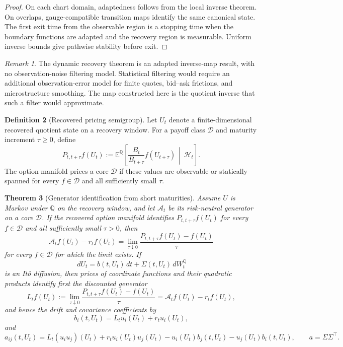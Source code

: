 \documentclass[11pt,a4paper]{amsart}
\theoremstyle{plain}
\newtheorem{theorem}{Theorem}[section]
\theoremstyle{definition}
\newtheorem{definition}[theorem]{Definition}
\theoremstyle{remark}
\newtheorem{remark}[theorem]{Remark}
\newcommand{\QQ}{\mathbb{Q}}
\newcommand{\EE}{\mathbb{E}}
\newcommand{\cD}{\mathcal{D}}
\newcommand{\cH}{\mathcal{H}}
\newcommand{\dd}{\,d}
\begin{document}
\begin{proof}
On each chart domain, adaptedness follows from the local inverse theorem.  On overlaps,
gauge-compatible transition maps identify the same canonical state.  The first exit time from
the observable region is a stopping time when the boundary functions are adapted and the
recovery region is measurable.  Uniform inverse bounds give pathwise stability before exit.
\end{proof}

\begin{remark}
The dynamic recovery theorem is an adapted inverse-map result, with no observation-noise filtering
model.  Statistical filtering would require an additional observation-error model for finite quotes,
bid--ask frictions, and microstructure smoothing.  The map constructed here is the
quotient inverse that such a filter would approximate.
\end{remark}

\begin{definition}[Recovered pricing semigroup]\label{def:recovered-pricing-semigroup}
Let \(U_t\) denote a finite-dimensional recovered quotient state on a recovery window.  For a
payoff class \(\cD\) and maturity increment \(\tau\ge0\), define
\[
        P_{t,t+\tau}f(U_t)
        :=
        \EE^\QQ\!\left[
        \frac{B_t}{B_{t+\tau}}f(U_{t+\tau})
        \,\middle|\,\cH_t
        \right].
\]
The option manifold prices a core \(\cD\) if these values are observable or statically spanned
for every \(f\in\cD\) and all sufficiently small \(\tau\).
\end{definition}

\begin{theorem}[Generator identification from short maturities]\label{thm:generator-identification}
Assume \(U\) is Markov under \(\QQ\) on the recovery window, and let \(\mathcal A_t\) be its
risk-neutral generator on a core \(\cD\).  If the recovered option manifold identifies
\(P_{t,t+\tau}f(U_t)\) for every \(f\in\cD\) and all sufficiently small \(\tau>0\), then
\[
        \mathcal A_t f(U_t)-r_tf(U_t)
        =
        \lim_{\tau\downarrow0}
        \frac{P_{t,t+\tau}f(U_t)-f(U_t)}{\tau}
\]
for every \(f\in\cD\) for which the limit exists.  If
\[
        \dd U_t=b(t,U_t)\dd t+\Sigma(t,U_t)\dd W_t^\QQ
\]
is an It\^o diffusion, then prices of coordinate functions and their quadratic products identify
first the discounted generator
\[
        L_t f(U_t)
        :=
        \lim_{\tau\downarrow0}
        \frac{P_{t,t+\tau}f(U_t)-f(U_t)}{\tau}
        =
        \mathcal A_t f(U_t)-r_tf(U_t),
\]
and hence the drift and covariance coefficients by
\[
        b_i(t,U_t)=L_tu_i(U_t)+r_tu_i(U_t),
\]
and
\[
        a_{ij}(t,U_t)
        =
        L_t(u_iu_j)(U_t)
        +
        r_tu_i(U_t)u_j(U_t)
        -
        u_i(U_t)b_j(t,U_t)
        -
        u_j(U_t)b_i(t,U_t),
        \qquad a=\Sigma\Sigma^\top .
\]
\end{theorem}
\end{document}
